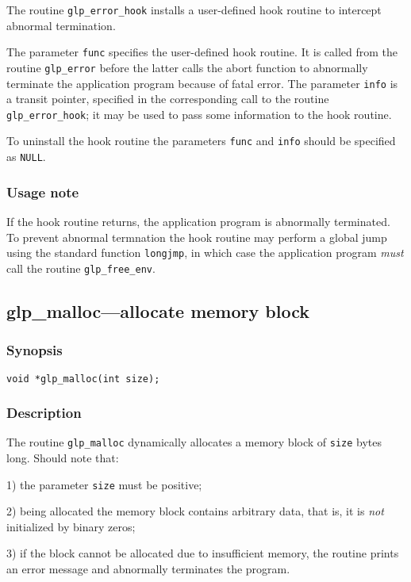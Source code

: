 The routine \verb|glp_error_hook| installs a user-defined hook routine
to intercept abnormal termination.

The parameter \verb|func| specifies the user-defined hook routine. It
is called from the routine \verb|glp_error| before the latter calls the
abort function to abnormally terminate the application program because
of fatal error. The parameter \verb|info| is a transit pointer,
specified in the corresponding call to the routine
\verb|glp_error_hook|; it may be used to pass some information to the
hook routine.

To uninstall the hook routine the parameters \verb|func| and \verb|info|
should be specified as \verb|NULL|.

\subsubsection*{Usage note}

If the hook routine returns, the application program is abnormally
terminated. To prevent abnormal termnation the hook routine may perform
a global jump using the standard function \verb|longjmp|, in which case
the application program {\it must} call the routine \verb|glp_free_env|.

\subsection{glp\_malloc---allocate memory block}

\subsubsection*{Synopsis}

\begin{verbatim}
void *glp_malloc(int size);
\end{verbatim}

\subsubsection*{Description}

The routine \verb|glp_malloc| dynamically allocates a memory block of
\verb|size| bytes long. Should note that:

1) the parameter \verb|size| must be positive;

2) being allocated the memory block contains arbitrary data, that is,
it is {\it not} initialized by binary zeros;

3) if the block cannot be allocated due to insufficient memory, the
routine prints an error message and abnormally terminates the program.

